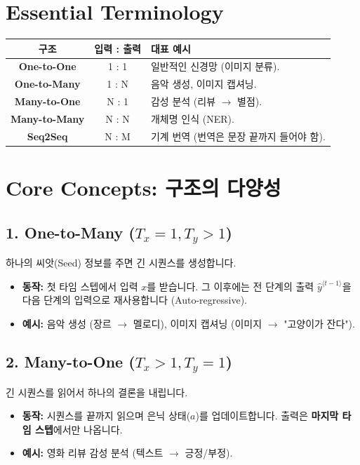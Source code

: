 \documentclass[11pt,a4paper]{book}
\theoremstyle{definition}
\begin{document}
\section{Essential Terminology}
\begin{center}
\begin{tabular}{|c|c|l|}
\hline
\textbf{구조} & \textbf{입력 : 출력} & \textbf{대표 예시} \\ \hline
\textbf{One-to-One} & 1 : 1 & 일반적인 신경망 (이미지 분류). \\ \hline
\textbf{One-to-Many} & 1 : N & 음악 생성, 이미지 캡셔닝. \\ \hline
\textbf{Many-to-One} & N : 1 & 감성 분석 (리뷰 $\to$ 별점). \\ \hline
\textbf{Many-to-Many} & N : N & 개체명 인식 (NER). \\ \hline
\textbf{Seq2Seq} & N : M & 기계 번역 (번역은 문장 끝까지 들어야 함). \\ \hline
\end{tabular}
\end{center}

\section{Core Concepts: 구조의 다양성}

\subsection{1. One-to-Many ($T_x=1, T_y>1$)}

하나의 씨앗(Seed) 정보를 주면 긴 시퀀스를 생성합니다.
\begin{itemize}
    \item \textbf{동작:} 첫 타임 스텝에서 입력 $x$를 받습니다. 그 이후에는 전 단계의 출력 $\hat{y}^{\langle t-1 \rangle}$을 다음 단계의 입력으로 재사용합니다 (Auto-regressive).
    \item \textbf{예시:} 음악 생성 (장르 $\to$ 멜로디), 이미지 캡셔닝 (이미지 $\to$ "고양이가 잔다").
\end{itemize}

\subsection{2. Many-to-One ($T_x>1, T_y=1$)}

긴 시퀀스를 읽어서 하나의 결론을 내립니다.
\begin{itemize}
    \item \textbf{동작:} 시퀀스를 끝까지 읽으며 은닉 상태($a$)를 업데이트합니다. 출력은 \textbf{마지막 타임 스텝}에서만 나옵니다.
    \item \textbf{예시:} 영화 리뷰 감성 분석 (텍스트 $\to$ 긍정/부정).
\end{itemize}
\end{document}

